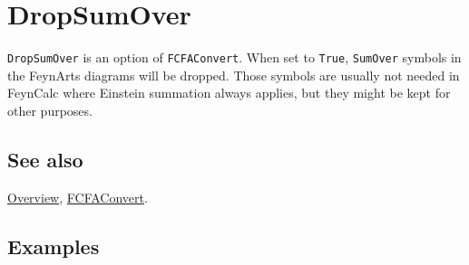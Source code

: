\documentclass[../FeynCalcManual.tex]{subfiles}
\begin{document}
\hypertarget{dropsumover}{%
\section{DropSumOver}\label{dropsumover}}

\texttt{DropSumOver} is an option of \texttt{FCFAConvert}. When set to
\texttt{True}, \texttt{SumOver} symbols in the FeynArts diagrams will be
dropped. Those symbols are usually not needed in FeynCalc where Einstein
summation always applies, but they might be kept for other purposes.

\subsection{See also}

\hyperlink{toc}{Overview}, \hyperlink{fcfaconvert}{FCFAConvert}.

\subsection{Examples}
\end{document}
